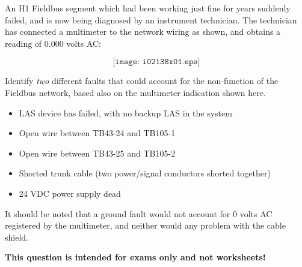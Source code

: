 

An H1 Fieldbus segment which had been working just fine for years suddenly failed, and is now being diagnosed by an instrument technician.  The technician has connected a multimeter to the network wiring as shown, and obtains a reading of 0.000 volts AC:

$$\texttt{[image: i02138x01.eps]}$$

Identify {\it two} different faults that could account for the non-function of the Fieldbus network, based also on the multimeter indication shown here.

\vskip 30pt







\begin{itemize}
\item{} LAS device has failed, with no backup LAS in the system
\item{} Open wire between TB43-24 and TB105-1
\item{} Open wire between TB43-25 and TB105-2
\item{} Shorted trunk cable (two power/signal conductors shorted together)
\item{} 24 VDC power supply dead
\end{itemize}

\vskip 10pt

It should be noted that a ground fault would not account for 0 volts AC registered by the multimeter, and neither would any problem with the cable shield.







{\bf This question is intended for exams only and not worksheets!}



